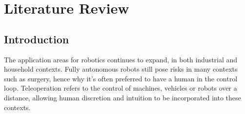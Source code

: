 \chapter{Literature Review}\label{ch:lit}








\section{Introduction}
The application areas for robotics continues to expand, in both industrial and household contexts. Fully autonomous robots still pose risks in many contexts such as surgery, hence why it's often preferred to have a human in the control loop. Teleoperation refers to the control of machines, vehicles or robots over a distance, allowing human discretion and intuition to be incorporated into these contexts.

